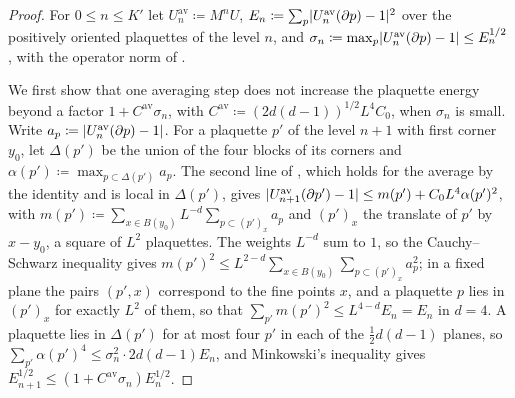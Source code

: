 \documentclass[11pt]{preprint}
\DeclarePairedDelimiter{\abs}{\lvert}{\rvert}
\numberwithin{equation}{section}
\theoremstyle{definition}
\theoremstyle{remark}
\theoremstyle{plain}
\begin{document}
\begin{proof}
For $0 \leq n \leq K'$ let $U^{\mathrm{av}}_n \coloneqq M^nU$, $E_n \coloneqq \sum_p\abs{U^{\mathrm{av}}_n(\partial p) - 1}^2$ over the positively oriented plaquettes of the level $n$, and $\sigma_n \coloneqq \max_p\abs{U^{\mathrm{av}}_n(\partial p) - 1} \leq E_n^{1/2}$, with the operator norm of \cite[(19)]{BalabanAVG}.

We first show that one averaging step does not increase the plaquette energy beyond a factor $1 + C^{\mathrm{av}}\sigma_n$, with $C^{\mathrm{av}} \coloneqq (2d(d - 1))^{1/2}L^4C_0$, when $\sigma_n$ is small. Write $a_p \coloneqq \abs{U^{\mathrm{av}}_n(\partial p) - 1}$. For a plaquette $p'$ of the level $n + 1$ with first corner $y_0$, let $\Delta(p')$ be the union of the four blocks of its corners and $\alpha(p') \coloneqq \max_{p \subset \Delta(p')}a_p$. The second line of \cite[(50), p.~25]{BalabanAVG}, which holds for the average \cite[(0.4)]{BalabanRG1} by the identity \cite[(48)]{BalabanAVG} and is local in $\Delta(p')$, gives $\abs{U^{\mathrm{av}}_{n+1}(\partial p') - 1} \leq m(p') + C_0L^4\alpha(p')^2$, with $m(p') \coloneqq \sum_{x \in B(y_0)}L^{-d}\sum_{p \subset (p')_x}a_p$ and $(p')_x$ the translate of $p'$ by $x - y_0$, a square of $L^2$ plaquettes. The weights $L^{-d}$ sum to $1$, so the Cauchy--Schwarz inequality gives $m(p')^2 \leq L^{2-d}\sum_{x \in B(y_0)}\sum_{p \subset (p')_x}a_p^2$; in a fixed plane the pairs $(p', x)$ correspond to the fine points $x$, and a plaquette $p$ lies in $(p')_x$ for exactly $L^2$ of them, so that $\sum_{p'}m(p')^2 \leq L^{4-d}E_n = E_n$ in $d = 4$. A plaquette lies in $\Delta(p')$ for at most four $p'$ in each of the $\frac12d(d - 1)$ planes, so $\sum_{p'}\alpha(p')^4 \leq \sigma_n^2 \cdot 2d(d - 1)E_n$, and Minkowski's inequality gives $E_{n+1}^{1/2} \leq (1 + C^{\mathrm{av}}\sigma_n)E_n^{1/2}$.


\end{proof}
\end{document}

